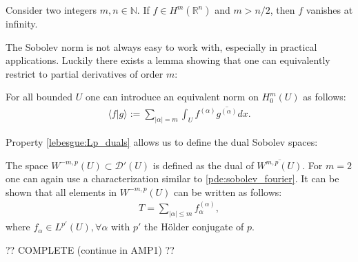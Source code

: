     \begin{property}
        Consider two integers $m,n\in\mathbb{N}$. If $f\in H^m(\mathbb{R}^n)$ and $m>n/2$, then $f$ vanishes at infinity.
    \end{property}

    The Sobolev norm is not always easy to work with, especially in practical applications. Luckily there exists a lemma showing that one can equivalently restrict to partial derivatives of order $m$:
    \begin{theorem}[Friedrich]
        For all bounded $U$ one can introduce an equivalent norm on $H^m_0(U)$ as follows:
        \begin{gather}
            \langle f|g \rangle := \sum_{|\alpha|=m}\int_U f^{(\alpha)}\overline{g^{(\alpha)}}dx.
        \end{gather}
    \end{theorem}

    Property \ref{lebesgue:Lp_duals} allows us to define the dual Sobolev spaces:
    \begin{definition}
        The space $W^{-m,p}(U)\subset\mathcal{D}'(U)$ is defined as the dual of $\overline{W^{m,p}(U)}$. For $m=2$ one can again use a characterization  similar to \eqref{pde:sobolev_fourier}. It can be shown that all elements in $W^{-m,p}(U)$ can be written as follows:
        \begin{gather}
            T = \sum_{|\alpha|\leq m}f^{(\alpha)}_\alpha,
        \end{gather}
        where $f_\alpha\in L^{p'}(U),\forall\alpha$ with $p'$ the H\"older conjugate of $p$.
    \end{definition}

    ?? COMPLETE (continue in AMP1) ??